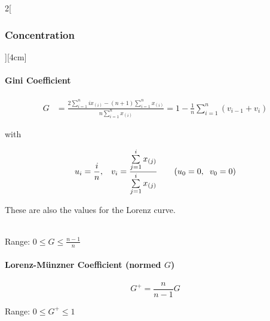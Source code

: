 \documentclass[8pt]{extarticle}
\begin{document}
\begin{multicols}{2}[\subsubsection{Concentration}][4cm] 

\paragraph{Gini Coefficient}

\begin{equation*} 
\begin{split}
G & = \frac{2\sum\limits_{i=1}^n ix_{(i)}-(n+1)\sum\limits_{i=1}^n x_{(i)}}{n\sum\limits_{i=1}^n x_{(i)}}  = 1-\frac{1}{n}\sum\limits_{i=1}^n(v_{i-1}+v_i)
\end{split}
\end{equation*}

with

$$  u_i=\frac{i}{n}, \hspace{0.3cm} v_i= \frac{\sum\limits_{j=1}^i x_{(j)}}{\sum\limits_{j=1}^i x_{(j)}} \hspace{0.7cm} (u_0=0, \hspace{0.2cm} v_0=0 )$$


\noindent These are also the values for the Lorenz curve.

\ \\

\indent Range: $ 0 \le G \le \frac{n-1}{n}$




\paragraph{Lorenz-Münzner Coefficient (normed $G$)}

$$G^+=\frac{n}{n-1}G$$

\indent Range: $ 0 \le G^+ \le 1$






\end{multicols}
\end{document}
